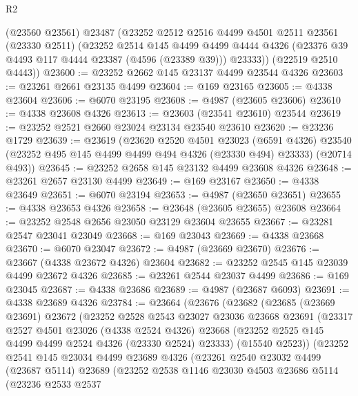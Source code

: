 \begin{lexlean}{R2}
\begin{coremodule}
      (@23560 @23561)
      @23487
      (@23252
        @2512
        @2516
        @4499
        @4501
        @2511
        @23561
        (@23330 @2511)
        (@23252
          @2514
          @145
          @4499
          @4499
          @4444
          @4326
          (@23376 @39 @4493 @117 @4444 @23387 (@4596 (@23389 @39)))
          @23333))
      (@22519 @2510 @4443))
@23600 := @23252 @2662 @145 @23137 @4499 @23544 @4326
@23603 := @23261 @2661 @23135 @4499
@23604 := @169 @23165
@23605 := @4338 @23604
@23606 := @6070 @23195
@23608 := @4987 (@23605 @23606)
@23610 := @4338 @23608 @4326
@23613 := @23603 (@23541 @23610) @23544
@23619 := @23252 @2521 @2660 @23024 @23134 @23540 @23610
@23620 := @23236 @1729
@23639 := @23619
    (@23620
      @2520
      @4501
      @23023
      (@6591 @4326)
      @23540
      (@23252 @495 @145 @4499 @4499 @494 @4326 (@23330 @494) @23333)
      (@20714 @493))
@23645 := @23252 @2658 @145 @23132 @4499 @23608 @4326
@23648 := @23261 @2657 @23130 @4499
@23649 := @169 @23167
@23650 := @4338 @23649
@23651 := @6070 @23194
@23653 := @4987 (@23650 @23651)
@23655 := @4338 @23653 @4326
@23658 := @23648 (@23605 @23655) @23608
@23664 := @23252 @2548 @2656 @23050 @23129 @23604 @23655
@23667 := @23281 @2547 @23041 @23049
@23668 := @169 @23043
@23669 := @4338 @23668
@23670 := @6070 @23047
@23672 := @4987 (@23669 @23670)
@23676 := @23667 (@4338 @23672 @4326) @23604
@23682 := @23252 @2545 @145 @23039 @4499 @23672 @4326
@23685 := @23261 @2544 @23037 @4499
@23686 := @169 @23045
@23687 := @4338 @23686
@23689 := @4987 (@23687 @6093)
@23691 := @4338 @23689 @4326
@23784 := @23664
    (@23676
      (@23682
        (@23685
          (@23669 @23691)
          @23672
          (@23252
            @2528
            @2543
            @23027
            @23036
            @23668
            @23691
            (@23317
              @2527
              @4501
              @23026
              (@4338 @2524 @4326)
              @23668
              (@23252 @2525 @145 @4499 @4499 @2524 @4326 (@23330 @2524) @23333)
              (@15540 @2523))
            (@23252
              @2541
              @145
              @23034
              @4499
              @23689
              @4326
              (@23261
                @2540
                @23032
                @4499
                (@23687 @5114)
                @23689
                (@23252
                  @2538
                  @1146
                  @23030
                  @4503
                  @23686
                  @5114
                  (@23236
                    @2533
                    @2537

\end{coremodule}
\end{lexlean}
